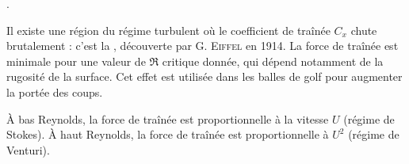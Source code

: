 \documentclass[12pt,fancy]{cours}
\begin{document}
\begin{liste}
\item {}.

Il existe une région du régime turbulent où le coefficient de traînée $C_x$ chute brutalement : c'est la , découverte par G. \textsc{Eiffel} en 1914. La force de traînée est minimale pour une valeur de $\Re$ critique donnée, qui dépend notamment de la rugosité de la surface. Cet effet est utilisée dans les balles de golf pour augmenter la portée des coups.
\end{liste}

\begin{prop}\label{prop:trainée}
À bas Reynolds, la force de traînée est proportionnelle à la vitesse $U$ (régime de Stokes). À haut Reynolds, la force de traînée est proportionnelle à $U^2$ (régime de Venturi).
\end{prop}
\end{document}
